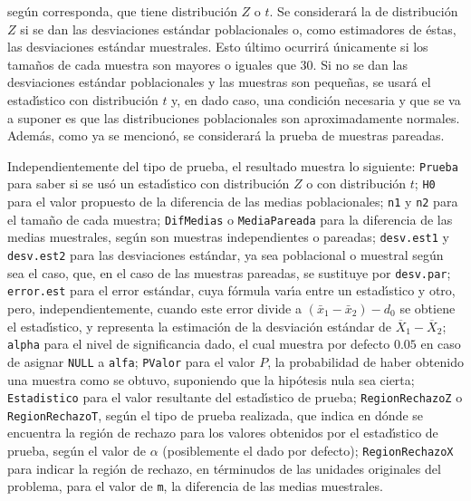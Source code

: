 \begin{solucion}
 seg\'un corresponda, que tiene distribuci\'on $Z$ o $t$.
 Se considerar\'a la de distribuci\'on $Z$ si se dan
 las desviaciones est\'andar poblacionales o,
 como estimadores de \'estas,
 las desviaciones est\'andar muestrales.
 Esto \'ultimo ocurrir\'a \'unicamente
 si los tama\~nos de cada muestra son mayores o iguales que $30$.
 Si no se dan las desviaciones est\'andar poblacionales
 y las muestras son peque\~nas,
 se usar\'a el estad\'{\i}stico con distribuci\'on $t$
 y, en dado caso, una condici\'on necesaria y que se va a suponer
 es que las distribuciones poblacionales son aproximadamente
 normales.
 Adem\'as, como ya se mencion\'o, se considerar\'a la prueba
 de muestras pareadas.
 \par
 Independientemente del tipo de prueba,
 el resultado muestra lo siguiente:
 \texttt{Prueba} para saber si se us\'o un estad\'{\i}stico
 con distribuci\'on $Z$ o con distribuci\'on $t$;
 \texttt{H0} para el valor propuesto de la diferencia
 de las medias poblacionales;
 \texttt{n1} y \texttt{n2} para el tama\~no de cada muestra;
 \texttt{DifMedias} o \texttt{MediaPareada}
 para la diferencia de las medias muestrales,
 seg\'un son muestras independientes o pareadas;
 \texttt{desv.est1} y \texttt{desv.est2} para las desviaciones
 est\'andar, ya sea poblacional o muestral seg\'un sea el caso,
 que, en el caso de las muestras pareadas, se sustituye
 por \texttt{desv.par};
 \texttt{error.est} para el error est\'andar,
 cuya f\'ormula var\'{\i}a entre un estad\'{\i}stico y otro,
 pero, independientemente,
 cuando este error divide a
 $\left(\bar{x}_1 - \bar{x}_2\right) - d_0$
 se obtiene el estad\'{\i}stico,
 y representa la estimaci\'on de la desviaci\'on est\'andar
 de $\overline{X}_1 - \overline{X}_2$;
 \texttt{alpha} para el nivel de significancia dado,
 el cual muestra por defecto $0.05$
 en caso de asignar \texttt{NULL} a \texttt{alfa};
 \texttt{PValor} para el valor $P$,
 la probabilidad de haber obtenido una muestra como se obtuvo,
 suponiendo que la hip\'otesis nula sea cierta;
 \texttt{Estadistico} para el valor resultante
 del estad\'{\i}stico de prueba;
 \texttt{RegionRechazoZ} o \texttt{RegionRechazoT},
 seg\'un el tipo de prueba realizada,
 que indica en d\'onde se encuentra la regi\'on de rechazo para
 los valores obtenidos por el estad\'{\i}stico de prueba,
 seg\'un el valor de $\alpha$ (posiblemente el dado por defecto);
 \texttt{RegionRechazoX} para indicar la regi\'on de rechazo,
 en t\'erminudos de las unidades originales del problema,
 para el valor de \texttt{m},
 la diferencia de las medias muestrales.
 \par 

\end{solucion}

